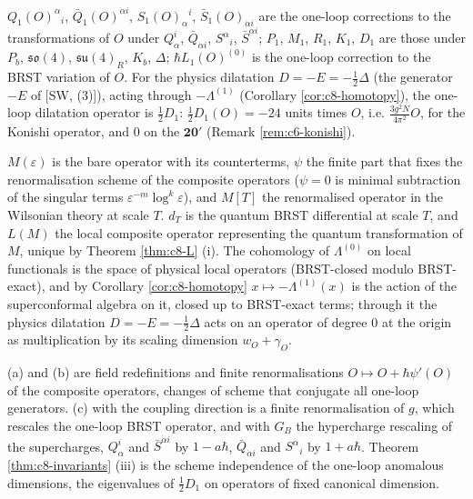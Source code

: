 \begin{remark}
$Q_1(O)^\alpha{}_i$, $\bar Q_1(O)^{\dot\alpha i}$, $S_1(O)_\alpha{}^i$, $\bar S_1(O)_{\dot\alpha i}$ are the one-loop corrections to the transformations of $O$ under $Q^i_\alpha$, $\bar Q_{\dot\alpha i}$, $S^\alpha{}_i$, $\bar S^{\dot\alpha i}$; $P_1$, $M_1$, $R_1$, $K_1$, $D_1$ are those under $P_b$, $\mathfrak{so}(4)$, $\mathfrak{su}(4)_R$, $K_b$, $\Delta$; $\hbar L_1(O)^{(0)}$ is the one-loop correction to the BRST variation of $O$. For the physics dilatation $D=-E=-\tfrac12\Delta$ (the generator $-E$ of [SW, (3)]), acting through $-\Lambda^{(1)}$ (Corollary \ref{cor:c8-homotopy}), the one-loop dilatation operator is $\tfrac12D_1$: $\tfrac12D_1(O)=-24$ units times $O$, i.e. $\frac{3g^2N}{4\pi^2}O$, for the Konishi operator, and $0$ on the $\mathbf{20'}$ (Remark \ref{rem:c6-konishi}).
\end{remark}

\begin{remark}
$M(\varepsilon)$ is the bare operator with its counterterms, $\psi$ the finite part that fixes the renormalisation scheme of the composite operators ($\psi=0$ is minimal subtraction of the singular terms $\varepsilon^{-m}\log^k\varepsilon$), and $M[T]$ the renormalised operator in the Wilsonian theory at scale $T$. $d_T$ is the quantum BRST differential at scale $T$, and $L(M)$ the local composite operator representing the quantum transformation of $M$, unique by Theorem \ref{thm:c8-L} (i). The cohomology of $\Lambda^{(0)}$ on local functionals is the space of physical local operators (BRST-closed modulo BRST-exact), and by Corollary \ref{cor:c8-homotopy} $x\mapsto-\Lambda^{(1)}(x)$ is the action of the superconformal algebra on it, closed up to BRST-exact terms; through it the physics dilatation $D=-E=-\tfrac12\Delta$ acts on an operator of degree $0$ at the origin as multiplication by its scaling dimension $w_O+\gamma_O$.
\end{remark}

\begin{remark}
(a) and (b) are field redefinitions and finite renormalisations $O\mapsto O+\hbar\psi'(O)$ of the composite operators, changes of scheme that conjugate all one-loop generators. (c) with the coupling direction is a finite renormalisation of $g$, which rescales the one-loop BRST operator, and with $G_B$ the hypercharge rescaling of the supercharges, $Q^i_\alpha$ and $\bar S^{\dot\alpha i}$ by $1-a\hbar$, $\bar Q_{\dot\alpha i}$ and $S^\alpha{}_i$ by $1+a\hbar$. Theorem \ref{thm:c8-invariants} (iii) is the scheme independence of the one-loop anomalous dimensions, the eigenvalues of $\tfrac12D_1$ on operators of fixed canonical dimension.
\end{remark}

